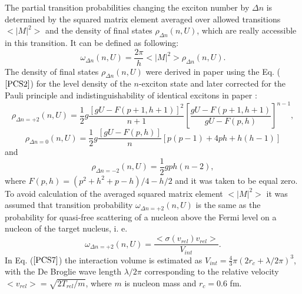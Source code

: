 \hspace{1.0em}The partial transition probabilities changing the exciton
number by $\Delta n$ is determined by the squared matrix element
averaged over allowed transitions $<|M|^{2}>$ and the density of final
states $\rho_{\Delta n}(n,U)$, which are really accessible in this
transition. It can be defined as following:
\begin{equation}
\label{PCS3}\omega_{\Delta n}(n,U)=\frac{2\pi}{h}<|M|^{2}>\rho_{\Delta n}(n,U).
\end{equation}
The density of final states $\rho_{\Delta n}(n,U)$ were derived in paper
\cite{Williams70} using the Eq. ($\ref{PCS2}$) for the level density of
the $n$-exciton state and later corrected for the Pauli principle and
indistinguishability of identical excitons in paper \cite{ROB73}:
\begin{equation}
\label{PCS4}\rho_{\Delta n = +2}(n,U)=\frac{1}{2}g\frac{[gU - F(p+1,h+1)]^2}
{n+1} [\frac{gU - F(p+1,h+1)}{gU - F(p,h)}]^{n-1},
\end{equation}
\begin{equation}
\label{PCS5}\rho_{\Delta n = 0}(n,U)=\frac{1}{2}g\frac{[gU - F(p,h)]}{n}
[p(p-1) + 4ph + h(h-1)]
\end{equation}
and
\begin{equation}
\label{PCS6}\rho_{\Delta n = -2}(n,U)=\frac{1}{2}gph(n-2),
\end{equation}
where $F(p,h)=(p^2 + h^2 + p -h)/4 - h/2$ and it was taken to be equal
zero.  To avoid calculation of the averaged squared matrix element
$<|M|^2>$ it was assumed \cite{GMT83} that transition probability
$\omega_{\Delta n = +2}(n,U)$ is the same as the probability for
quasi-free scattering of a nucleon above the Fermi level on a nucleon of
the target nucleus, i. e.
\begin{equation}
\label{PCS7}\omega_{\Delta n =+2}(n,U)=\frac{<\sigma(v_{rel})v_{rel}>}{V_{int}}.
\end{equation}
In Eq. ($\ref{PCS7}$) the interaction volume is estimated as 
$V_{int}=\frac{4}{3}\pi(2r_c + \lambda/2\pi)^3$, 
with the De Broglie wave length
$\lambda/2\pi$ corresponding to the relative velocity 
$<v_{rel}>=\sqrt{2T_{rel}/
m}$, where $m$ is nucleon mass and $r_c = 0.6$ fm. 

